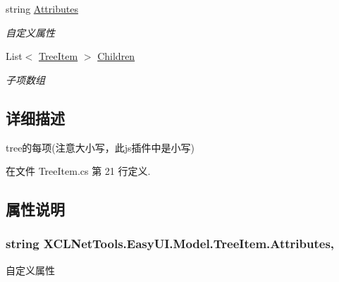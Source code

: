 \begin{DoxyCompactItemize}
string \hyperlink{class_x_c_l_net_tools_1_1_easy_u_i_1_1_model_1_1_tree_item_aa0c852d1b67d5eefacee0463914ec936}{Attributes}
\begin{DoxyCompactList}\small\item\em 自定义属性 \end{DoxyCompactList}\item 
List$<$ \hyperlink{class_x_c_l_net_tools_1_1_easy_u_i_1_1_model_1_1_tree_item}{Tree\-Item} $>$ \hyperlink{class_x_c_l_net_tools_1_1_easy_u_i_1_1_model_1_1_tree_item_a2558788818daccf8bd99032753ebcc29}{Children}
\begin{DoxyCompactList}\small\item\em 子项数组 \end{DoxyCompactList}\end{DoxyCompactItemize}


\subsection{详细描述}
tree的每项(注意大小写，此js插件中是小写) 



在文件 Tree\-Item.\-cs 第 21 行定义.



\subsection{属性说明}
\hypertarget{class_x_c_l_net_tools_1_1_easy_u_i_1_1_model_1_1_tree_item_aa0c852d1b67d5eefacee0463914ec936}{
\subsubsection[{Attributes}]{\setlength{\rightskip}{0pt plus 5cm}string X\-C\-L\-Net\-Tools.\-Easy\-U\-I.\-Model.\-Tree\-Item.\-Attributes\hspace{0.3cm}{\ttfamily [get]}, {\ttfamily [set]}}}\label{class_x_c_l_net_tools_1_1_easy_u_i_1_1_model_1_1_tree_item_aa0c852d1b67d5eefacee0463914ec936}


自定义属性 



